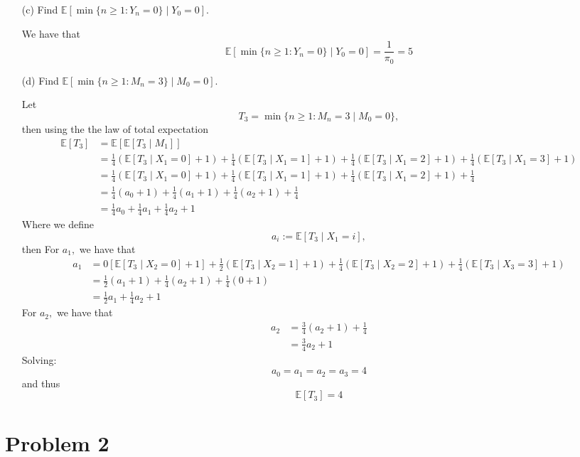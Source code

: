 \documentclass[11pt]{article}
\newcommand{\bbE}{\mathbb{E}}
\begin{document}
\begin{enumerate}
    \item[(c)] Find $\mathbb{E}[\min\{n \geq 1 : Y_n = 0\} \mid Y_0 = 0]$.
\begin{solution}
    We have that 
    \[\mathbb{E}[\min\{n \geq 1 : Y_n = 0\} \mid Y_0 = 0] = \frac{1}{\pi_0} = 5\]
\end{solution}

    \item[(d)] Find $\mathbb{E}[\min\{n \geq 1 : M_n = 3\} \mid M_0 = 0]$.

\begin{solution}
    Let 
    \[T_{3} = \min\{n \geq 1 : M_n = 3 \mid M_0 = 0\},\] then using the the law of total expectation
    \begin{align*}
        \bbE[T_3] &= \bbE[\bbE[T_3 \mid M_1]]\\
        &= \frac{1}{4}(\bbE[T_3 \mid X_1 =0] + 1) + \frac{1}{4}(\bbE[T_3 \mid X_1= 1] + 1)+ \frac{1}{4}(\bbE[T_3 \mid X_1 =2] + 1) + \frac{1}{4}(\bbE[T_3 \mid X_1 =3] + 1)\\
        &= \frac{1}{4}(\bbE[T_3 \mid X_1 =0] + 1) + \frac{1}{4}(\bbE[T_3 \mid X_1= 1] + 1)+ \frac{1}{4}(\bbE[T_3 \mid X_1 =2] + 1) + \frac{1}{4}\\
        &= \frac{1}{4}(a_0 + 1) + \frac{1}{4}(a_1 + 1) + \frac{1}{4}(a_2 + 1) + \frac{1}{4}\\
        &= \frac{1}{4}a_0 + \frac{1}{4}a_1 + \frac{1}{4}a_2 + 1
    \end{align*}
Where we define 
\[a_i := \bbE[T_3 \mid X_1 = i],\]
then 
For $a_1,$ we have that 
\begin{align*}
a_1 &= 0[\bbE[T_3 \mid X_2 = 0] + 1] + \frac{1}{2}(\bbE[T_3 \mid X_2 = 1] + 1) + \frac{1}{4}(\bbE[T_3 \mid X_2 = 2] + 1) + \frac{1}{4}(\bbE[T_3 \mid X_3 = 3  ] + 1)\\
&= \frac{1}{2}(a_1 + 1) + \frac{1}{4}(a_2 + 1) + \frac{1}{4}(0 + 1)\\
&= \frac{1}{2}a_1 + \frac{1}{4}a_2 +  1
\end{align*}
For $a_2,$ we have that 
\begin{align*}
    a_2&= \frac{3}{4}(a_2 + 1) + \frac{1}{4}\\
    &= \frac{3}{4}a_2 + 1
\end{align*}
Solving:
\[a_0 = a_1 = a_2 = a_3 =4\] and thus 
\[\bbE[T_3] = 4\]
\end{solution}
\end{enumerate}


\newpage
\section*{Problem 2}
\end{document}
